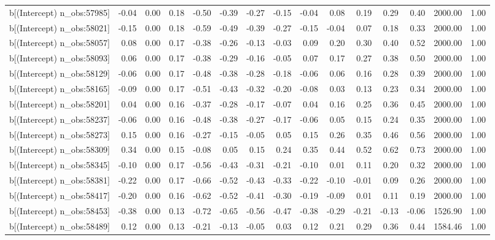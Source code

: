 \begin{table}[ht]
\begin{tabular}{rrrrrrrrrrrrrrr}
  b[(Intercept) n\_obs:57985] & -0.04 & 0.00 & 0.18 & -0.50 & -0.39 & -0.27 & -0.15 & -0.04 & 0.08 & 0.19 & 0.29 & 0.40 & 2000.00 & 1.00 \\ 
  b[(Intercept) n\_obs:58021] & -0.15 & 0.00 & 0.18 & -0.59 & -0.49 & -0.39 & -0.27 & -0.15 & -0.04 & 0.07 & 0.18 & 0.33 & 2000.00 & 1.00 \\ 
  b[(Intercept) n\_obs:58057] & 0.08 & 0.00 & 0.17 & -0.38 & -0.26 & -0.13 & -0.03 & 0.09 & 0.20 & 0.30 & 0.40 & 0.52 & 2000.00 & 1.00 \\ 
  b[(Intercept) n\_obs:58093] & 0.06 & 0.00 & 0.17 & -0.38 & -0.29 & -0.16 & -0.05 & 0.07 & 0.17 & 0.27 & 0.38 & 0.50 & 2000.00 & 1.00 \\ 
  b[(Intercept) n\_obs:58129] & -0.06 & 0.00 & 0.17 & -0.48 & -0.38 & -0.28 & -0.18 & -0.06 & 0.06 & 0.16 & 0.28 & 0.39 & 2000.00 & 1.00 \\ 
  b[(Intercept) n\_obs:58165] & -0.09 & 0.00 & 0.17 & -0.51 & -0.43 & -0.32 & -0.20 & -0.08 & 0.03 & 0.13 & 0.23 & 0.34 & 2000.00 & 1.00 \\ 
  b[(Intercept) n\_obs:58201] & 0.04 & 0.00 & 0.16 & -0.37 & -0.28 & -0.17 & -0.07 & 0.04 & 0.16 & 0.25 & 0.36 & 0.45 & 2000.00 & 1.00 \\ 
  b[(Intercept) n\_obs:58237] & -0.06 & 0.00 & 0.16 & -0.48 & -0.38 & -0.27 & -0.17 & -0.06 & 0.05 & 0.15 & 0.24 & 0.35 & 2000.00 & 1.00 \\ 
  b[(Intercept) n\_obs:58273] & 0.15 & 0.00 & 0.16 & -0.27 & -0.15 & -0.05 & 0.05 & 0.15 & 0.26 & 0.35 & 0.46 & 0.56 & 2000.00 & 1.00 \\ 
  b[(Intercept) n\_obs:58309] & 0.34 & 0.00 & 0.15 & -0.08 & 0.05 & 0.15 & 0.24 & 0.35 & 0.44 & 0.52 & 0.62 & 0.73 & 2000.00 & 1.00 \\ 
  b[(Intercept) n\_obs:58345] & -0.10 & 0.00 & 0.17 & -0.56 & -0.43 & -0.31 & -0.21 & -0.10 & 0.01 & 0.11 & 0.20 & 0.32 & 2000.00 & 1.00 \\ 
  b[(Intercept) n\_obs:58381] & -0.22 & 0.00 & 0.17 & -0.66 & -0.52 & -0.43 & -0.33 & -0.22 & -0.10 & -0.01 & 0.09 & 0.26 & 2000.00 & 1.00 \\ 
  b[(Intercept) n\_obs:58417] & -0.20 & 0.00 & 0.16 & -0.62 & -0.52 & -0.41 & -0.30 & -0.19 & -0.09 & 0.01 & 0.11 & 0.19 & 2000.00 & 1.00 \\ 
  b[(Intercept) n\_obs:58453] & -0.38 & 0.00 & 0.13 & -0.72 & -0.65 & -0.56 & -0.47 & -0.38 & -0.29 & -0.21 & -0.13 & -0.06 & 1526.90 & 1.00 \\ 
  b[(Intercept) n\_obs:58489] & 0.12 & 0.00 & 0.13 & -0.21 & -0.13 & -0.05 & 0.03 & 0.12 & 0.21 & 0.29 & 0.36 & 0.44 & 1584.46 & 1.00 \\ 

\end{tabular}
\end{table}
